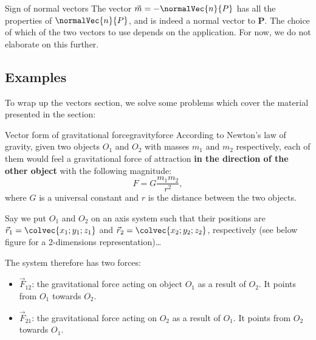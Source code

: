 \begin{note}{Sign of normal vectors}{}
	The vector $\vec{m}=-\normalVec{n}{P}$ has all the properties of $\normalVec{n}{P}$, and is indeed a normal vector to $\mathbf{P}$. The choice of which of the two vectors to use depends on the application. For now, we do not elaborate on this further.
\end{note}

\subsection{Examples}
To wrap up the vectors section, we solve some problems which cover the material presented in the section:

\begin{example}{Vector form of gravitational force}{gravityforce}
  According to Newton's law of gravity, given two objects $O_{1}$ and $O_{2}$ with masses $m_{1}$ and $m_{2}$ respectively, each of them would feel a gravitational force of attraction \textbf{in the direction of the other object} with the following magnitude:
  \[
    F = G \frac{m_{1}m_{2}}{r^{2}},
  \]
  where $G$ is a universal constant and $r$ is the distance between the two objects.
  
  Say we put $O_{1}$ and $O_{2}$ on an axis system such that their positions are $\vec{r}_{1} = \colvec{x_{1};y_{1};z_{1}}$ and $\vec{r}_{2}=\colvec{x_{2};y_{2};z_{2}}$, respectively (see below figure for a 2-dimensions representation)\dots

  The system therefore has two forces:
  \begin{itemize}
    \item $\vec{F}_{12}$: the gravitational force acting on object $O_{1}$ as a result of $O_{2}$. It points from $O_{1}$ towards $O_{2}$.
    \item $\vec{F}_{21}$: the gravitational force acting on $O_{2}$ as a result of $O_{1}$. It points from $O_{2}$ towards $O_{1}$.
  \end{itemize}

  \centering


\end{example}

